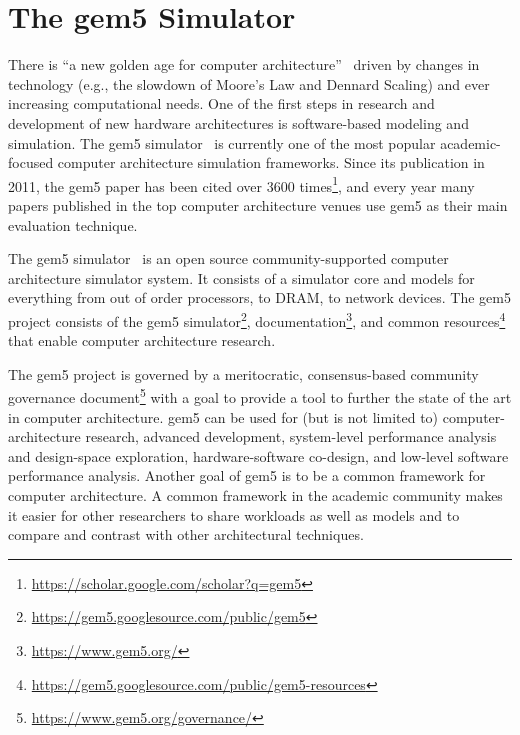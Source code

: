 

\section{The gem5 Simulator}

There is ``a new golden age for computer architecture''~\cite{turinglecture,cacm} driven by changes in technology (e.g., the slowdown of Moore's Law and Dennard Scaling) and ever increasing computational needs.
One of the first steps in research and development of new hardware architectures is software-based modeling and simulation.
The gem5 simulator~\cite{Binkert-gem5-2011} is currently one of the most popular academic-focused computer architecture simulation frameworks.
Since its publication in 2011, the gem5 paper has been cited over 3600 times\footnote{\url{https://scholar.google.com/scholar?q=gem5}}, and every year many papers published in the top computer architecture venues use gem5 as their main evaluation technique.

The gem5 simulator~\cite{Binkert-gem5-2011} is an open source community-supported computer architecture simulator system.
It consists of a simulator core and models for everything from out of order processors, to DRAM, to network devices.
The gem5 project consists of the gem5 simulator\footnote{\url{https://gem5.googlesource.com/public/gem5}}, documentation\footnote{\url{https://www.gem5.org/}}, and common resources\footnote{\url{https://gem5.googlesource.com/public/gem5-resources}} that enable computer architecture research.

The gem5 project is governed by a meritocratic, consensus-based community governance document\footnote{\url{https://www.gem5.org/governance/}} with a goal to provide a tool to further the state of the art in computer architecture.
gem5 can be used for (but is not limited to) computer-architecture research, advanced development, system-level performance analysis and design-space exploration, hardware-software co-design, and low-level software performance analysis.
Another goal of gem5 is to be a common framework for computer architecture.
A common framework in the academic community makes it easier for other researchers to share workloads as well as models and to compare and contrast with other architectural techniques.

